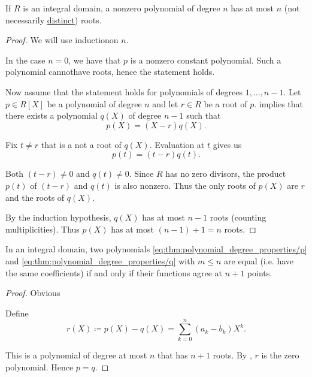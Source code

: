 \begin{proposition}\label{thm:integral_domain_polynomial_root_limit}
  If \( R \) is an integral domain, a nonzero polynomial of degree \( n \) has at most \( n \) (not necessarily \hyperref[def:polynomial_root_multiplicity]{distinct}) roots.
\end{proposition}
\begin{proof}
  We will use induction\IND on \( n \).

  In the case \( n = 0 \), we have that \( p \) is a nonzero constant polynomial. Such a polynomial cannot\LEM have roots, hence the statement holds.

  Now assume that the statement holds for polynomials of degrees \( 1, \ldots, n - 1 \). Let \( p \in R[X] \) be a polynomial of degree \( n \) and let \( r \in R \) be a root of \( p \).  implies that there exists a polynomial \( q(X) \) of degree \( n - 1 \) such that
  \begin{equation*}
    p(X) = (X - r) q(X).
  \end{equation*}

  Fix \( t \neq r \) that is a not a root of \( q(X) \). Evaluation at \( t \) gives us
  \begin{equation*}
    p(t) = (t - r) q(t).
  \end{equation*}

  Both \( (t - r) \neq 0 \) and \( q(t) \neq 0 \). Since \( R \) has no zero divisors, the product \( p(t) \) of \( (t - r) \) and \( q(t) \) is also nonzero. Thus the only roots of \( p(X) \) are \( r \) and the roots of \( q(X) \).

  By the induction hypothesis, \( q(X) \) has at most \( n - 1 \) roots (counting multiplicities). Thus \( p(X) \) has at most \( (n - 1) + 1 = n \) roots.
\end{proof}

\begin{proposition}\label{thm:polynomials_with_identical_values}
  In an integral domain, two polynomials \eqref{eq:thm:polynomial_degree_properties/p} and \eqref{eq:thm:polynomial_degree_properties/q} with \( m \leq n \) are equal (i.e. have the same coefficients) if and only if their functions agree at \( n + 1 \) points.
\end{proposition}
\begin{proof}
  \Sufficiency Obvious

  \Necessity Define
  \begin{equation*}
    r(X) \coloneqq p(X) - q(X) = \sum_{k=0}^n (a_k - b_k) X^k.
  \end{equation*}

  This is a polynomial of degree at most \( n \) that has \( n + 1 \) roots. By , \( r \) is the zero polynomial. Hence \( p = q \).
\end{proof}

